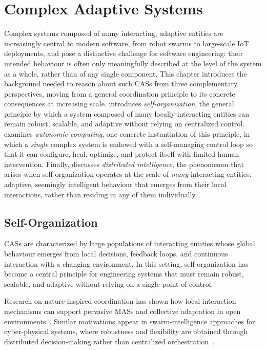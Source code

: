 \chapter{Complex Adaptive Systems}

Complex systems composed of many interacting, adaptive entities
are increasingly central to modern software,
from robot swarms to large-scale \ac{IoT} deployments,
and pose a distinctive challenge for software engineering:
their intended behaviour is often only meaningfully described at the level of the system as a whole,
rather than of any single component.
%
This chapter introduces the background needed to reason about such \acp{CAS} from three complementary perspectives,
moving from a general coordination principle to its concrete consequences at increasing scale.
%
 introduces \emph{self-organization},
the general principle by which a system composed of many locally-interacting entities can remain robust,
scalable,
and adaptive without relying on centralized control.
%
 examines \emph{autonomic computing},
one concrete instantiation of this principle,
in which a \emph{single} complex system is endowed with a self-managing control loop
so that it can configure, heal, optimize, and protect itself with limited human intervention.
%
Finally,
 discusses \emph{distributed intelligence},
the phenomenon that arises when self-organization operates at the scale of \emph{many} interacting entities:
adaptive, seemingly intelligent behaviour that emerges from their local interactions,
rather than residing in any of them individually.

\section{Self-Organization}
\label{sec:self-organization}

\acp{CAS} are characterized by large populations 
of interacting entities whose global behaviour emerges from local decisions, 
feedback loops, 
and continuous interaction with a changing environment. 
%
In this setting, 
self-organization has become a central principle for engineering systems that must remain robust,
scalable, 
and adaptive without relying on a single point of control. 

Research on nature-inspired coordination
has shown how local interaction mechanisms
can support pervasive \acp{MAS} and collective adaptation in open environments~\cite{zambonelli2015percom}.
%
Similar motivations appear in swarm-intelligence approaches for cyber-physical systems,
where robustness and flexibility are obtained through distributed decision-making
rather than centralized orchestration~\cite{schranz2021swevo}.

